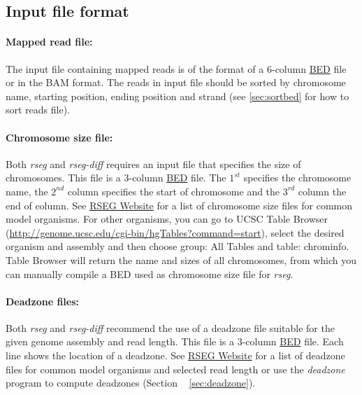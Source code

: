\documentclass[11pt]{report}
\begin{document}
\subsection{Input file format}
\label{sec:input-file}

\paragraph{Mapped read file:} The input file containing mapped reads
is of the format of a 6-column
\href{http://genome.ucsc.edu/FAQ/FAQformat.html#format1}{BED} file or in the BAM
format. The reads in input file should be sorted by chromosome name, starting
position, ending position and strand (see \ref{sec:sortbed} for how to sort
reads file).

\paragraph{Chromosome size file:} Both \textit{rseg} and
\textit{rseg-diff} requires an input file that specifies the size of
chromosomes. This file is a 3-column
\href{http://genome.ucsc.edu/FAQ/FAQformat.html#format1}{BED}
file. The $1^{st}$ specifies the chromosome name, the $2^{nd}$ column
specifies the start of chromosome and the $3^{rd}$ column the end of
column. See \href{http://smithlab.cmb.usc.edu/histone/software/}{RSEG
  Website} for a list of chromosome size files for common model
organisms. For other organisms, you can go to UCSC Table Browser
(\url{http://genome.ucsc.edu/cgi-bin/hgTables?command=start}), select
the desired organism and assembly and then choose group: All Tables
and table: chrominfo. Table Browser will return the name and sizes of
all chromosomes, from which you can manually compile a BED used as
chromosome size file for \textit{rseg}.

\paragraph{Deadzone files:} Both \textit{rseg} and \textit{rseg-diff}
recommend the use of a deadzone file suitable for the given genome
assembly and read length. This file is a 3-column
\href{http://genome.ucsc.edu/FAQ/FAQformat.html#format1}{BED}
file. Each line shows the location of a deadzone. See
\href{http://smithlab.cmb.usc.edu/histone/software}{RSEG Website} for
a list of deadzone files for common model organisms and selected read
length or use the \textit{deadzone} program to compute deadzones
(Section ~ \ref{sec:deadzone}).
 
\end{document}
